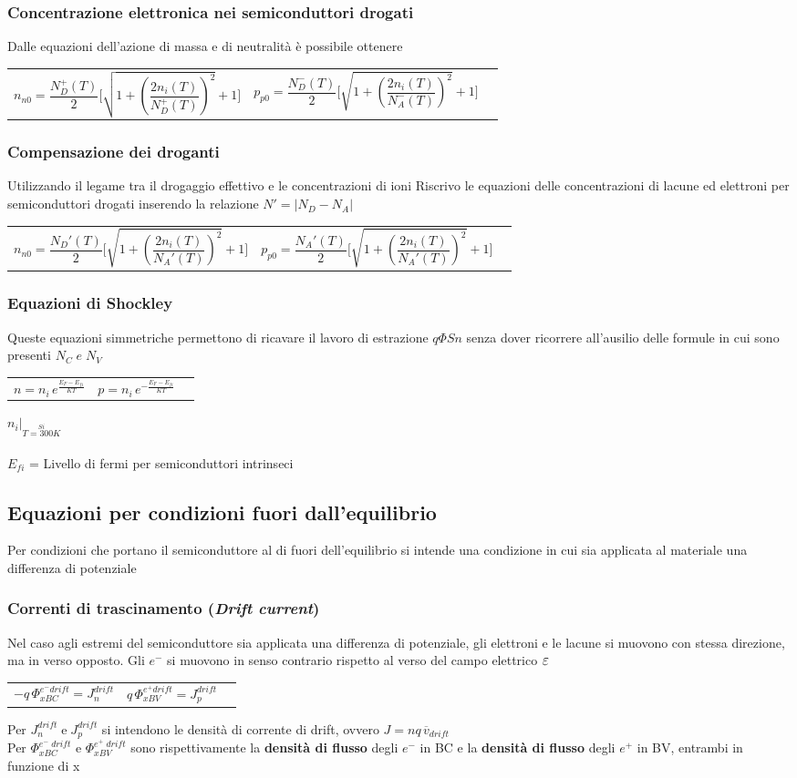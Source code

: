\documentclass[12pt,a4paper]{article}
\makeatletter
\newcommand{\barSi}{\Big\lvert_{ \overset{Si}{T=300K}}}
\newcommand{\Beps}{ \mathlarger{\mathlarger{ \varepsilon }}}
\newcommand{\deqlist}[5]{
	\subsubsection*{#1}
	
	\parbox{19cm}{#2}
	
	\noindent\begin{tabularx}{\textwidth}{@{}XXX@{}}
	\begin{equation}
	#3
	\end{equation}  & 
	\begin{equation}
	#4
	\end{equation}
	
	\end{tabularx}
	
	\noindent\parbox{19cm}{#5}}
\makeatother
\begin{document}
	
		\deqlist{Concentrazione elettronica nei semiconduttori drogati}
		{Dalle equazioni dell'azione di massa e di neutralità è possibile ottenere}
		{n_{n0} = \frac{N_{D}^{+}(T)}{2}\Bigg[\sqrt{1+(\frac{2n_{i}(T)}{N_{D}^{+}(T)})^{2}}+1\Bigg]}
		{p_{p0} = \frac{N_{D}^{-}(T)}{2}\Bigg[\sqrt{1+(\frac{2n_{i}(T)}{N_{A}^{-}(T)})^{2}}+1\Bigg]}
		{}
		
		
		\deqlist{Compensazione dei droganti}
		{Utilizzando il legame tra il drogaggio effettivo e le concentrazioni di ioni  Riscrivo le equazioni delle concentrazioni di lacune ed elettroni per semiconduttori drogati inserendo la relazione $ N'=|N_{D}-N_{A}| $}
		{n_{n0} = \frac{N_{D}'(T)}{2}\Bigg[\sqrt{1+(\frac{2n_{i}(T)}{N_{A}'(T)})^{2}}+1\Bigg]}
		{p_{p0} = \frac{N_{A}'(T)}{2}\Bigg[\sqrt{1+(\frac{2n_{i}(T)}{N_{A}'(T)})^{2}}+1\Bigg]}
		{}
		
		
		\deqlist{Equazioni di Shockley}
		{Queste equazioni simmetriche permettono di ricavare il lavoro di estrazione $ q \Phi Sn $ senza dover ricorrere all'ausilio delle formule in cui sono presenti $N_{C} \; e \; N_{V}$}
		{n=n_{i} \, e^{\frac{E_{F}-E_{fi}}{KT}}}
		{p=n_{i} \, e^{-\frac{E_{F}-E_{fi}}{KT}}}
		{$ n_{i} \barSi $ \\  \\ $ E_{fi} $ = Livello di fermi per semiconduttori intrinseci}


	\subsection{Equazioni per condizioni fuori dall'equilibrio}
		
		Per condizioni  che portano il semiconduttore al di fuori dell'equilibrio si intende una condizione in cui sia applicata al materiale una differenza di potenziale
		
		\deqlist{Correnti di trascinamento (\textit{Drift current})}
		{Nel caso agli estremi del semiconduttore sia applicata una differenza di potenziale, gli elettroni e le lacune si muovono con stessa direzione, ma in verso opposto. Gli $ e^{-} $ si muovono in senso contrario rispetto al verso del campo elettrico $ \Beps $}
		{-q \, \Phi^{e^{-}drift}_{xBC} = J_{n}^{drift} }
		{q \, \Phi^{e^{+}drift}_{xBV} = J_{p}^{drift} }
		{Per $ J_{n}^{drift} \; \text{e} \; J_{p}^{drift} $ si intendono le densità di corrente di drift, ovvero $ J=nq \, \overline{v}_{drift} $ \\ Per  $\Phi^{e^{-} \; drift}_{xBC}$  e $\Phi^{e^{+} \; drift}_{xBV} $ sono rispettivamente la \textbf{densità di flusso} degli $ e^{- }$ in BC e  la \textbf{densità di flusso} degli $e^{+}$ in BV, entrambi in funzione di x}
		
\end{document}
